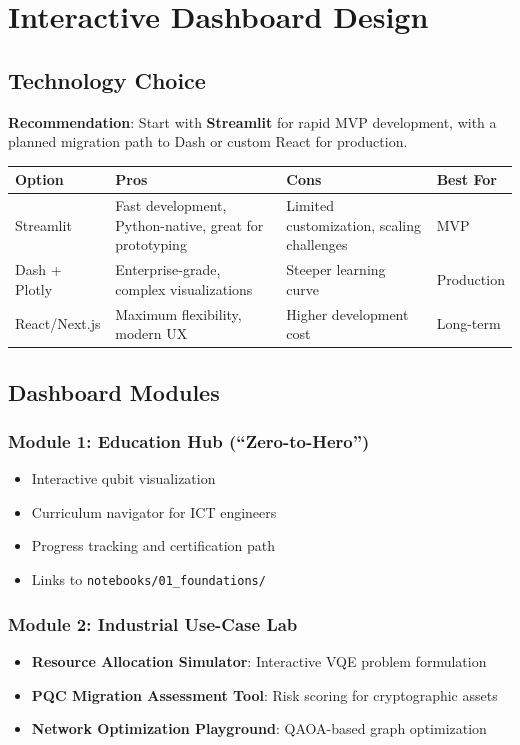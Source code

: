 \documentclass[11pt,a4paper]{article}
\begin{document}
\section{Interactive Dashboard Design}

\subsection{Technology Choice}

\textbf{Recommendation}: Start with \textbf{Streamlit} for rapid MVP development, with a planned migration path to Dash or custom React for production.

\begin{tabular}{lp{4cm}p{4cm}p{3cm}}
\toprule
\textbf{Option} & \textbf{Pros} & \textbf{Cons} & \textbf{Best For} \\
\midrule
Streamlit & Fast development, Python-native, great for prototyping & Limited customization, scaling challenges & MVP \\
Dash + Plotly & Enterprise-grade, complex visualizations & Steeper learning curve & Production \\
React/Next.js & Maximum flexibility, modern UX & Higher development cost & Long-term \\
\bottomrule
\end{tabular}

\subsection{Dashboard Modules}

\subsubsection{Module 1: Education Hub (``Zero-to-Hero'')}
\begin{itemize}
    \item Interactive qubit visualization
    \item Curriculum navigator for ICT engineers
    \item Progress tracking and certification path
    \item Links to \texttt{notebooks/01\_foundations/}
\end{itemize}

\subsubsection{Module 2: Industrial Use-Case Lab}
\begin{itemize}
    \item \textbf{Resource Allocation Simulator}: Interactive VQE problem formulation
    \item \textbf{PQC Migration Assessment Tool}: Risk scoring for cryptographic assets
    \item \textbf{Network Optimization Playground}: QAOA-based graph optimization
\end{itemize}
\end{document}
